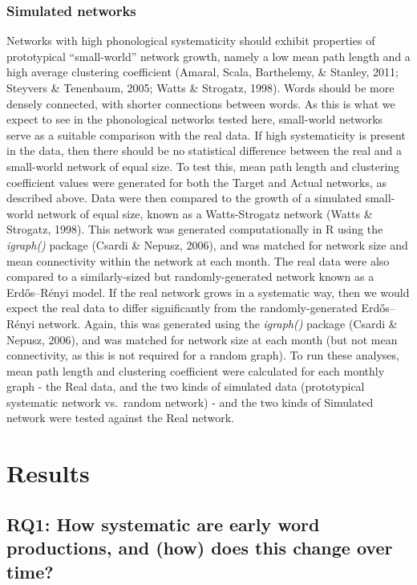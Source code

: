 \documentclass[
  man]{apa6}
\begin{document}
\hypertarget{simulated-networks}{%
\subsubsection{Simulated networks}\label{simulated-networks}}

Networks with high phonological systematicity should exhibit properties of prototypical ``small-world'' network growth, namely a low mean path length and a high average clustering coefficient (Amaral, Scala, Barthelemy, \& Stanley, 2011; Steyvers \& Tenenbaum, 2005; Watts \& Strogatz, 1998). Words should be more densely connected, with shorter connections between words. As this is what we expect to see in the phonological networks tested here, small-world networks serve as a suitable comparison with the real data. If high systematicity is present in the data, then there should be no statistical difference between the real and a small-world network of equal size. To test this, mean path length and clustering coefficient values were generated for both the Target and Actual networks, as described above. Data were then compared to the growth of a simulated small-world network of equal size, known as a Watts-Strogatz network (Watts \& Strogatz, 1998). This network was generated computationally in R using the \emph{igraph()} package (Csardi \& Nepusz, 2006), and was matched for network size and mean connectivity within the network at each month. The real data were also compared to a similarly-sized but randomly-generated network known as a Erdős--Rényi model. If the real network grows in a systematic way, then we would expect the real data to differ significantly from the randomly-generated Erdős--Rényi network. Again, this was generated using the \emph{igraph()} package (Csardi \& Nepusz, 2006), and was matched for network size at each month (but not mean connectivity, as this is not required for a random graph). To run these analyses, mean path length and clustering coefficient were calculated for each monthly graph - the Real data, and the two kinds of simulated data (prototypical systematic network vs.~random network) - and the two kinds of Simulated network were tested against the Real network.

\hypertarget{results}{%
\section{Results}\label{results}}

\hypertarget{rq1-how-systematic-are-early-word-productions-and-how-does-this-change-over-time}{%
\subsection{RQ1: How systematic are early word productions, and (how) does this change over time?}\label{rq1-how-systematic-are-early-word-productions-and-how-does-this-change-over-time}}
\end{document}
